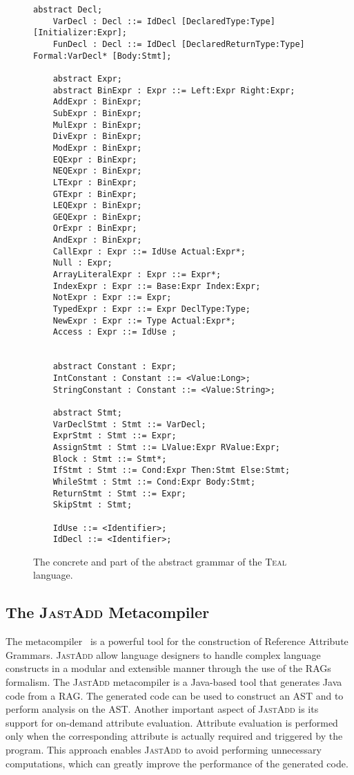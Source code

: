 \begin{figure}[H]
\begin{minipage}{0.8\textwidth}
\begin{lrbox}{\mylistingbox}
\begin{lstlisting}[language=JastAdd]
    abstract Decl;
    VarDecl : Decl ::= IdDecl [DeclaredType:Type] [Initializer:Expr];
    FunDecl : Decl ::= IdDecl [DeclaredReturnType:Type] Formal:VarDecl* [Body:Stmt];

    abstract Expr;
    abstract BinExpr : Expr ::= Left:Expr Right:Expr;
    AddExpr : BinExpr;
    SubExpr : BinExpr;
    MulExpr : BinExpr;
    DivExpr : BinExpr;
    ModExpr : BinExpr;
    EQExpr : BinExpr;
    NEQExpr : BinExpr;
    LTExpr : BinExpr;
    GTExpr : BinExpr;
    LEQExpr : BinExpr;
    GEQExpr : BinExpr;
    OrExpr : BinExpr;
    AndExpr : BinExpr;
    CallExpr : Expr ::= IdUse Actual:Expr*;
    Null : Expr;
    ArrayLiteralExpr : Expr ::= Expr*;
    IndexExpr : Expr ::= Base:Expr Index:Expr;
    NotExpr : Expr ::= Expr;
    TypedExpr : Expr ::= Expr DeclType:Type;
    NewExpr : Expr ::= Type Actual:Expr*; 
    Access : Expr ::= IdUse ;
    

    abstract Constant : Expr;
    IntConstant : Constant ::= <Value:Long>;
    StringConstant : Constant ::= <Value:String>;
   
    abstract Stmt;
    VarDeclStmt : Stmt ::= VarDecl;
    ExprStmt : Stmt ::= Expr;
    AssignStmt : Stmt ::= LValue:Expr RValue:Expr;
    Block : Stmt ::= Stmt*;
    IfStmt : Stmt ::= Cond:Expr Then:Stmt Else:Stmt;
    WhileStmt : Stmt ::= Cond:Expr Body:Stmt;
    ReturnStmt : Stmt ::= Expr;
    SkipStmt : Stmt;
    
    IdUse ::= <Identifier>;
    IdDecl ::= <Identifier>;
        \end{lstlisting}
\end{lrbox}
\scalebox{0.75}{\usebox{\mylistingbox}}

        \end{minipage}
\caption{\label{fig:tealGrammar} The concrete and part of the abstract grammar of the \textsc{Teal} language.}
\end{figure}


\subsection{The \textsc{JastAdd} Metacompiler}
\label{sec:jastadd}
The  metacompiler~\cite{DBLP:journals/entcs/HedinM01} is a powerful tool for the construction of
Reference Attribute Grammars.
\textsc{JastAdd} allow language designers to  handle complex language constructs in a modular and extensible
manner through the use of the RAGs formalism.
The \textsc{JastAdd} metacompiler is a Java-based tool that generates
Java code from a RAG. The generated code can be used to construct an AST and to perform
analysis on the AST.
Another important aspect of \textsc{JastAdd} is its support for on-demand attribute evaluation. 
Attribute evaluation is performed only when the corresponding 
attribute is actually required and triggered by the program. This approach enables \textsc{JastAdd} to 
avoid performing unnecessary computations, which can greatly improve the 
performance of the generated code.

